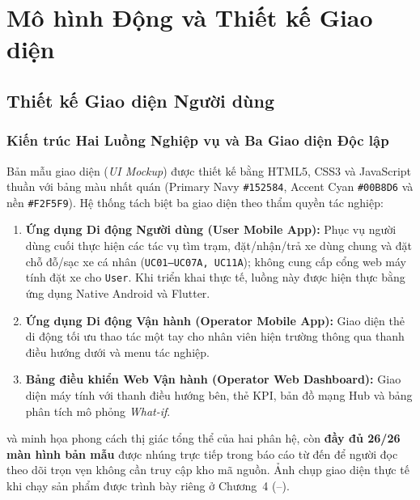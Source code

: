 \section{Mô hình Động và Thiết kế Giao diện}

\subsection{Thiết kế Giao diện Người dùng}

\subsubsection*{Kiến trúc Hai Luồng Nghiệp vụ và Ba Giao diện Độc lập}
Bản mẫu giao diện (\textit{UI Mockup}) được thiết kế bằng HTML5, CSS3 và JavaScript thuần với bảng màu nhất quán (Primary Navy \texttt{\#152584}, Accent Cyan \texttt{\#00B8D6} và nền \texttt{\#F2F5F9}). Hệ thống tách biệt ba giao diện theo thẩm quyền tác nghiệp:
\begin{enumerate}[leftmargin=*,nosep]
    \item \textbf{Ứng dụng Di động Người dùng (User Mobile App):} Phục vụ người dùng cuối thực hiện các tác vụ tìm trạm, đặt/nhận/trả xe dùng chung và đặt chỗ đỗ/sạc xe cá nhân (\texttt{UC01--UC07A, UC11A}); không cung cấp cổng web máy tính đặt xe cho \texttt{User}. Khi triển khai thực tế, luồng này được hiện thực bằng ứng dụng Native Android và Flutter.
    \item \textbf{Ứng dụng Di động Vận hành (Operator Mobile App):} Giao diện thẻ di động tối ưu thao tác một tay cho nhân viên hiện trường thông qua thanh điều hướng dưới và menu tác nghiệp.
    \item \textbf{Bảng điều khiển Web Vận hành (Operator Web Dashboard):} Giao diện máy tính với thanh điều hướng bên, thẻ KPI, bản đồ mạng Hub và bảng phân tích mô phỏng \textit{What-if}.
\end{enumerate}

 và  minh họa phong cách thị giác tổng thể của hai phân hệ, còn \textbf{đầy đủ 26/26 màn hình bản mẫu} được nhúng trực tiếp trong báo cáo từ  đến  để người đọc theo dõi trọn vẹn không cần truy cập kho mã nguồn. Ảnh chụp giao diện thực tế khi chạy sản phẩm được trình bày riêng ở Chương~4 (--).

